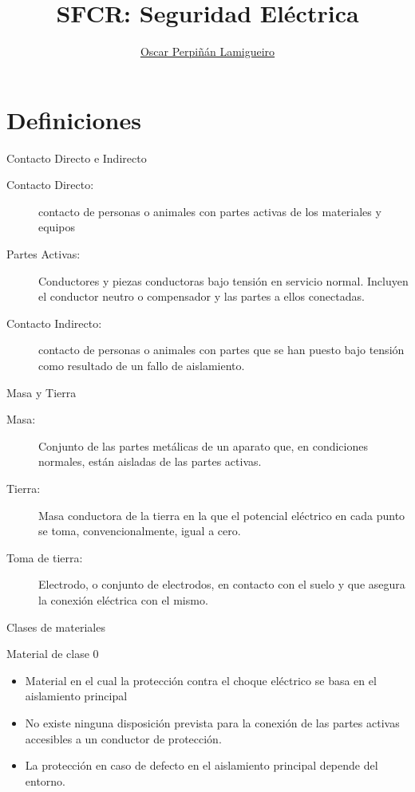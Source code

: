 \documentclass[aspectratio=169, usenames,svgnames,dvipsnames]{beamer}
\author{\href{https://oscarperpinan.github.io}{Oscar Perpiñán Lamigueiro}}
\date{}
\title{SFCR: Seguridad Eléctrica}
\institute[UPM]{Universidad Politécnica de Madrid}
\begin{document}
\maketitle


\section{Definiciones}
\label{sec:org42b5189}

\begin{frame}[label={sec:orge51a021}]{Contacto Directo e Indirecto}
\begin{description}
\item[{Contacto Directo:}] contacto de personas o animales con partes
activas de los materiales y equipos

\item[{Partes Activas:}] Conductores y piezas conductoras bajo tensión en
servicio normal. Incluyen el conductor neutro o compensador y las
partes a ellos conectadas.

\item[{Contacto Indirecto:}] contacto de personas o animales con partes que
se han puesto bajo tensión como resultado de un fallo de aislamiento.
\end{description}
\end{frame}

\begin{frame}[label={sec:org9629ace}]{Masa y Tierra}
\begin{description}
\item[{Masa:}] Conjunto de las partes metálicas de un aparato que, en
condiciones normales, están aisladas de las partes activas.

\item[{Tierra:}] Masa conductora de la tierra en la que el potencial
eléctrico en cada punto se toma, convencionalmente, igual a cero.

\item[{Toma de tierra:}] Electrodo, o conjunto de electrodos, en contacto
con el suelo y que asegura la conexión eléctrica con el mismo.
\end{description}
\end{frame}

\begin{frame}[label={sec:orged5fb2a}]{Clases de materiales}
\begin{block}{Material de clase 0}
\begin{itemize}
\item Material en el cual la protección contra el choque eléctrico se basa
en el aislamiento principal
\item No existe ninguna disposición prevista para la conexión de las
partes activas accesibles a un conductor de protección.
\item La protección en caso de defecto en el aislamiento principal depende
del entorno.
\end{itemize}
\end{block}
\end{frame}
\end{document}
